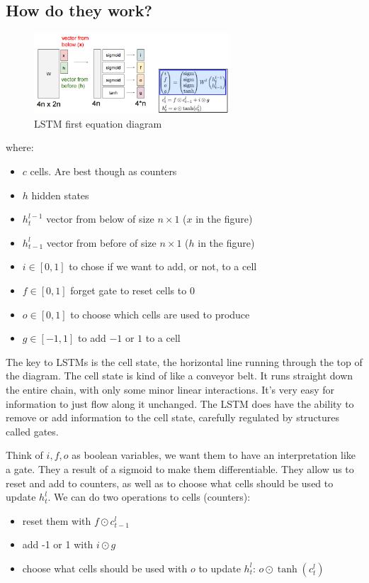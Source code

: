 \documentclass{article}
\begin{document}
	\subsection*{How do they work?}
	\begin{figure}[h]
		\centering
		\includegraphics[width=0.65\textwidth]{Images/recurrent_neural_networks/9.png}
		\caption{LSTM first equation diagram}
	\end{figure}
	where:
	\begin{itemize}
		\item $c$ cells. Are best though as counters
		\item $h$ hidden states
		\item $h_t^{l-1}$ vector from below of size $n \times 1$ ($x$ in the figure)
		\item $h_{t-1}^{l}$ vector from before of size $n \times 1$ ($h$ in the figure)
		\item $i \in [0,1]$ to chose if we want to add, or not, to a cell
		\item $f \in [0,1]$ forget gate to reset cells to $0$
		\item $o \in [0,1]$ to choose which cells are used to produce
		\item $g \in [-1,1]$ to add $-1$ or $1$ to a cell
	\end{itemize}
	
	The key to LSTMs is the cell state, the horizontal line running through the top of the diagram. The cell state is kind of like a conveyor belt. It runs straight down the entire chain, with only some minor linear interactions. It’s very easy for information to just flow along it unchanged. The LSTM does have the ability to remove or add information to the cell state, carefully regulated by structures called gates.
	
	Think of $i,f,o$ as boolean variables, we want them to have an interpretation like a gate. They a result of a sigmoid to make them differentiable. They allow us to reset and add to counters, as well as to choose what cells should be used to update $h^l_t$. We can do two operations to cells (counters):
	\begin{itemize}
		\item reset them with $f \odot c^l_{t-1}$
		\item add -1 or 1 with $i \odot g$
		\item choose what cells should be used with $o$ to update $h^l_t$: $o \odot \tanh(c^l_t)$
	\end{itemize}
	
\end{document}
